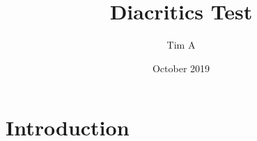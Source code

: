\documentclass{article}
\title{Diacritics Test}
\author{Tim A}
\date{October 2019}
\begin{document}
\maketitle

\section{Introduction}
\end{document}
